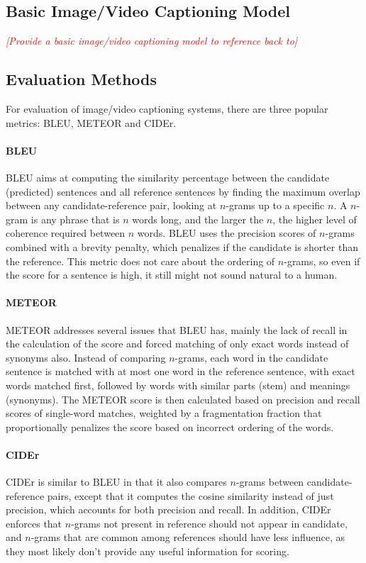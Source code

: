 \documentclass[10pt,twocolumn,letterpaper]{article}
\newcommand{\todo}[1]{\textcolor{red}{{\em [#1]}} }
\begin{document}
\subsection{Basic Image/Video Captioning Model}

\todo{Provide a basic image/video captioning model to reference back to}

\subsection{Evaluation Methods}

For evaluation of image/video captioning systems, there are three popular
metrics: BLEU, METEOR and CIDEr.

\paragraph{BLEU}
BLEU aims at computing the similarity percentage between the candidate
(predicted) sentences and all reference sentences by finding the maximum
overlap between any candidate-reference pair, looking at $n$-grams up to a
specific $n$. A $n$-gram is any phrase that is $n$ words long, and the larger
the $n$, the higher level of coherence required between $n$ words. BLEU uses
the precision scores of $n$-grams combined with a brevity penalty, which
penalizes if the candidate is shorter than the reference. This metric
does not care about the ordering of $n$-grams, so even if the score for a
sentence is high, it still might not sound natural to a human.

\paragraph{METEOR}
METEOR addresses several issues that BLEU has, mainly the lack of recall in
the calculation of the score and forced matching of only exact words instead
of synonyms also. Instead of comparing $n$-grams, each word in the candidate
sentence is matched with at most one word in the reference sentence, with
exact words matched first, followed by words with similar parts (stem) and
meanings (synonyms). The METEOR score is then calculated based on precision
and recall scores of single-word matches, weighted by a fragmentation fraction
that proportionally penalizes the score based on incorrect ordering of the
words.

\paragraph{CIDEr}
CIDEr is similar to BLEU in that it also compares $n$-grams between
candidate-reference pairs, except that it computes the cosine similarity
instead of just precision, which accounts for both precision and recall. In
addition, CIDEr enforces that $n$-grams not present in reference should not
appear in candidate, and $n$-grams that are common among references should
have less influence, as they most likely don't provide any useful information
for scoring.
\end{document}
